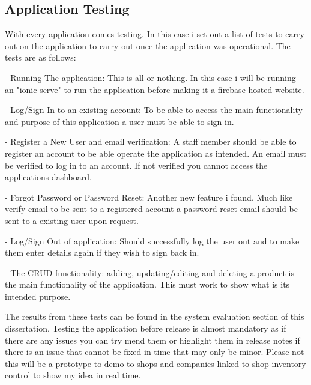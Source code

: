 \subsection{Application Testing}

With every application comes testing. In this case i set out a list of tests to carry out on the application to carry out once the application was operational.
The tests are as follows:
\newline

- Running The application: This is all or nothing. In this case i will be running an "ionic serve" to run the application before making it a firebase hosted website.
\newline

- Log/Sign In to an existing account: To be able to access the main functionality and purpose of this application a user must be able to sign in. 
\newline

- Register a New User and email verification: A staff member should be able to register an account to be able operate the application as intended. An email must be verified to log in to an account. If not verified you cannot access the applications dashboard.
\newline

- Forgot Password or Password Reset: Another new feature i found. Much like verify email to be sent to a registered account a password reset email should be sent to a existing user upon request. 
\newline

- Log/Sign Out of application: Should successfully log the user out and to make them enter details again if they wish to sign back in.
\newline

- The CRUD functionality: adding, updating/editing and deleting a product is the main functionality of the application. This must work to show what is its intended purpose. \newline

The results from these tests can be found in the system evaluation section of this dissertation. Testing the application before release is almost mandatory as if there are any issues you can try mend them or highlight them in release notes if there is an issue that cannot be fixed in time that may only be minor. Please not this will be a prototype to demo to shops and companies linked to shop inventory control to show my idea in real time.


